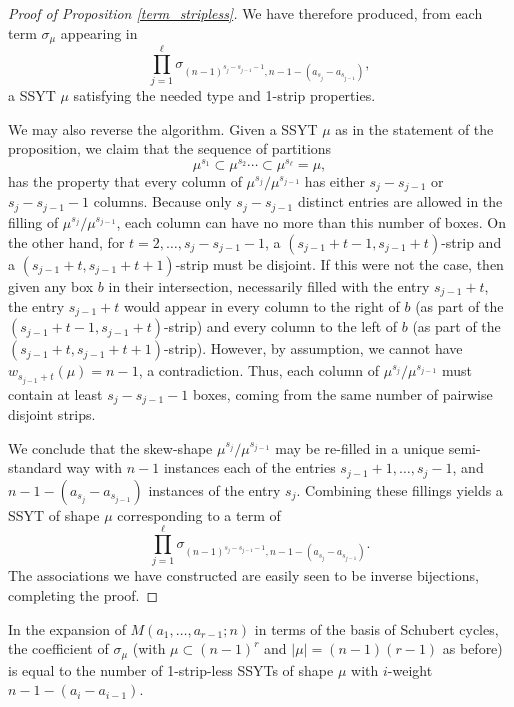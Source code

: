 \begin{proof}[Proof of Proposition \ref{term_stripless}]
We have therefore produced, from each term $\sigma_\mu$ appearing in
\begin{equation*}
 \prod_{j=1}^{\ell}\sigma_{(n-1)^{s_j-s_{j-1}-1},n-1-(a_{s_j}-a_{s_{j-1}})},
 \end{equation*}
 a SSYT $\mu$ satisfying the needed type and 1-strip properties. 
 
We may also reverse the algorithm. Given a SSYT $\mu$ as in the statement of the proposition, we claim that the sequence of partitions
 \begin{equation*}
\mu^{s_1}\subset\mu^{s_2}\cdots\subset\mu^{s_\ell}=\mu,
 \end{equation*}
has the property that every column of $\mu^{s_j}/\mu^{s_{j-1}}$ has either $s_j-s_{j-1}$ or $s_{j}-s_{j-1}-1$ columns. Because only $s_j-s_{j-1}$ distinct entries are allowed in the filling of $\mu^{s_j}/\mu^{s_{j-1}}$, each column can have no more than this number of boxes. On the other hand, for $t=2,\ldots,s_j-s_{j-1}-1$, a $(s_{j-1}+t-1,s_{j-1}+t)$-strip and a $(s_{j-1}+t,s_{j-1}+t+1)$-strip must be disjoint. If this were not the case, then given any box $b$ in their intersection, necessarily filled with the entry $s_{j-1}+t$, the entry $s_{j-1}+t$ would appear in every column to the right of $b$ (as part of the $(s_{j-1}+t-1,s_{j-1}+t)$-strip) and every column to the left of $b$ (as part of the $(s_{j-1}+t,s_{j-1}+t+1)$-strip). However, by assumption, we cannot have $w_{s_{j-1}+t}(\mu)=n-1$, a contradiction. Thus, each column of $\mu^{s_j}/\mu^{s_{j-1}}$ must contain at least $s_j-s_{j-1}-1$ boxes, coming from the same number of pairwise disjoint strips.

We conclude that the skew-shape $\mu^{s_j}/\mu^{s_{j-1}}$ may be re-filled in a unique semi-standard way with $n-1$ instances each of the entries $s_{j-1}+1,\ldots,s_j-1$, and $n-1-(a_{s_j}-a_{s_{j-1}})$ instances of the entry $s_j$. Combining these fillings yields a SSYT of shape $\mu$ corresponding to a term of 
\begin{equation*}
 \prod_{j=1}^{\ell}\sigma_{(n-1)^{s_j-s_{j-1}-1},n-1-(a_{s_j}-a_{s_{j-1}})}.
 \end{equation*}
 The associations we have constructed are easily seen to be inverse bijections, completing the proof.
\end{proof}

\begin{coro}\label{pie_refined}
In the expansion of $M(a_1,\ldots,a_{r-1};n)$ in terms of the basis of Schubert cycles, the coefficient of $\sigma_\mu$ (with $\mu\subset(n-1)^{r}$ and $|\mu|=(n-1)(r-1)$ as before) is equal to the number of 1-strip-less SSYTs of shape $\mu$ with $i$-weight $n-1-(a_{i}-a_{i-1})$.
\end{coro}


